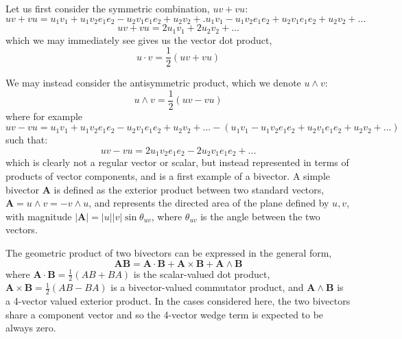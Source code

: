 \documentclass[11pt]{article} %
\begin{document}
Let us first consider the symmetric combination, $uv + vu$:
\begin{equation}
uv + vu =u_1   v_1   + u_1 v_2 e_1  e_2  - u_2  v_1 e_1 e_2 + u_2  v_2   +.u_1   v_1   - u_1 v_2 e_1  e_2  + u_2  v_1 e_1 e_2 + u_2  v_2 + ...
\end{equation}
\begin{equation}
uv + vu =2 u_1   v_1   + 2  u_2  v_2    +  ...
\end{equation}
which we may immediately see gives us the vector dot product,
\begin{equation}
u \cdot v = \frac{1}{2} ( uv + vu )
\end{equation}

We may instead consider the antisymmetric product, which we denote $u \wedge v$:
\begin{equation}
u \wedge v = \frac{1}{2} ( uv - vu )
\end{equation}
where for example 
\begin{equation}
uv - vu  =  u_1   v_1   + u_1 v_2 e_1  e_2  - u_2  v_1 e_1 e_2 + u_2  v_2   + ... -(   u_1   v_1   - u_1 v_2 e_1  e_2   +  u_2  v_1 e_1 e_2 + u_2  v_2  + ...)
\end{equation}
such that:
\begin{equation}
uv - vu  = 2 u_1 v_2 e_1  e_2  -2  u_2  v_1 e_1 e_2  + ...
\end{equation}
which is clearly not a regular vector or scalar, but instead represented in terms of products of vector components, and is a first example of a bivector. A  simple bivector $\mathbf{A}$ is defined as the exterior product between two standard vectors, $\mathbf{A} = u \wedge v = - v \wedge u$, and represents the directed area of the plane defined by $u,v$, with magnitude $| \mathbf{A} | = |u| |v| \sin \theta_{uv}$, where $\theta_{uv}$ is the angle between the two vectors.


The geometric product of two bivectors can be expressed in the general form,
\begin{equation}
\mathbf{AB} = \mathbf{A} \cdot \mathbf {B} + \mathbf{A} \times \mathbf{B} + \mathbf{A} \wedge \mathbf{B} 
\end{equation}
where $\mathbf{A} \cdot \mathbf{B} = \frac{1}{2}(AB + BA) $ is the scalar-valued dot product, $ \mathbf{A} \times \mathbf{B}   = \frac{1}{2}(AB - BA)$ is a bivector-valued commutator product, and $\mathbf{A} \wedge \mathbf{B} $ is a 4-vector valued exterior product. In the cases considered here, the two bivectors share a component vector and so the 4-vector wedge term is expected to be always zero. 
\end{document}
